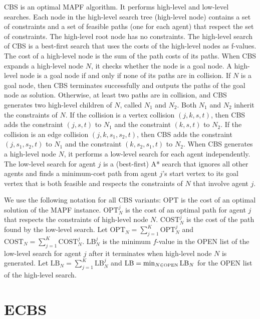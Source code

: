 \documentclass[letterpaper]{article}
\theoremstyle{definition}
\newcommand{\open}{\mbox{OPEN}\xspace}
\newcommand{\lb}{\mbox{LB}\xspace}
\newcommand{\lbn}[1]{\ensuremath{\mbox{LB}_{#1}}}
\newcommand{\lbna}[2]{\ensuremath{\mbox{LB}_{#1}^{#2}}}
\newcommand{\opt}{\mbox{OPT}\xspace}
\newcommand{\optn}[1]{\ensuremath{\mbox{OPT}_{#1}}}
\newcommand{\optna}[2]{\ensuremath{\mbox{OPT}_{#1}^{#2}}}
\newcommand{\costn}[1]{\ensuremath{\mbox{COST}_{#1}}}
\newcommand{\costna}[2]{\ensuremath{\mbox{COST}_{#1}^{#2}}}
\begin{document}
CBS \cite{SSFS:AIJ:15} is an optimal MAPF algorithm. It performs high-level
and low-level searches. Each node in the high-level search tree (high-level
node) contains a set of constraints and a set of feasible paths (one for each
agent) that respect the set of constraints. The high-level root node has no
constraints. The high-level search of CBS is a best-first search that uses the
costs of the high-level nodes as f-values. The cost of a high-level node is
the sum of the path costs of its paths. When CBS expands a high-level node
$N$, it checks whether the node is a goal node. A high-level node is a
goal node if and only if none of its paths are in collision. If $N$ is a goal
node, then CBS terminates successfully and outputs the paths of the goal node
as solution. Otherwise, at least two paths are in collision, and CBS generates
two high-level children of $N$, called $N_1$ and $N_2$. Both $N_1$ and $N_2$
inherit the constraints of $N$. If the collision is a vertex collision
$(j,k,s,t)$, then CBS adds the constraint $(j,s,t)$ to $N_1$ and the
constraint $(k,s,t)$ to $N_2$. If the collision is an edge collision
$(j,k,s_1,s_2,t)$, then CBS adds the constraint $(j,s_1,s_2,t)$ to $N_1$ and
the constraint $(k,s_2,s_1,t)$ to $N_2$. When CBS generates a high-level node
$N$, it performs a low-level search for each agent independently. The
low-level search for agent $j$ is a (best-first) A* search that ignores all
other agents and finds a minimum-cost path from agent $j$'s start vertex to
its goal vertex that is both feasible and respects the constraints of $N$ that
involve agent $j$.

We use the following notation for all CBS variants: \opt is the cost of an
optimal solution of the MAPF instance. \optna N j is the cost of an optimal
path for agent $j$ that respects the constraints of high-level node $N$.
$\costna N j$ is the cost of the path found by the low-level search.  Let
$\optn N = \sum_{j=1}^K \optna N j$ and $\costn N = \sum_{j=1}^K \costna N j$.
$\lbna N j$ is the minimum $f$-value in the \open list of the low-level search
for agent $j$ after it terminates when high-level node $N$ is generated. Let
$\lbn N = \sum_{j = 1}^K \lbna N j$ and $\lb = \min_{N \in \tiny \open} \lbn
N$ for the \open list of the high-level search.

\section{ECBS}
\end{document}
